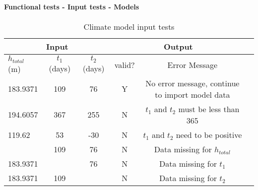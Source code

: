 \documentclass[12pt, titlepage]{article}
\begin{document}
\paragraph{Functional tests - Input tests - Models}

\begin{center}
\begin{table}[h]
\resizebox{\textwidth}{!}
{ %
    \begin{tabular}{ lcc|ccc }
    \hline
      \multicolumn{3}{c|}{Input }             & \multicolumn{2}{c}{Output} \\ \hline
        $h_{total}$ (m)   &   $t_1$ (days)   & $t_2$ (days)  &   valid?   &   Error Message \\ \hline
    
       183.9371  & 109 & 76 &  Y  & No error message, continue to import model data  \\    \hline
       194.6057  & 367 & 255 &  N  &  $t_1$ and $t_2$ must be less than 365  \\    \hline
       119.62  & 53 & -30 &  N  & $t_1$ and $t_2$ need to be positive                 \\    \hline  
         & 109 & 76 &  N  & Data missing for $h_{total}$                \\    \hline  
       183.9371  &  & 76 &   N  & Data missing for  $t_1$                    \\    \hline
       183.9371  & 109 &  &  N  & Data missing for  $t_2$                       \\    \hline
    \end{tabular} %
}
\caption{Climate model input tests}
\label{Table:climate_test}
\end{table}
\end{center}
\end{document}
